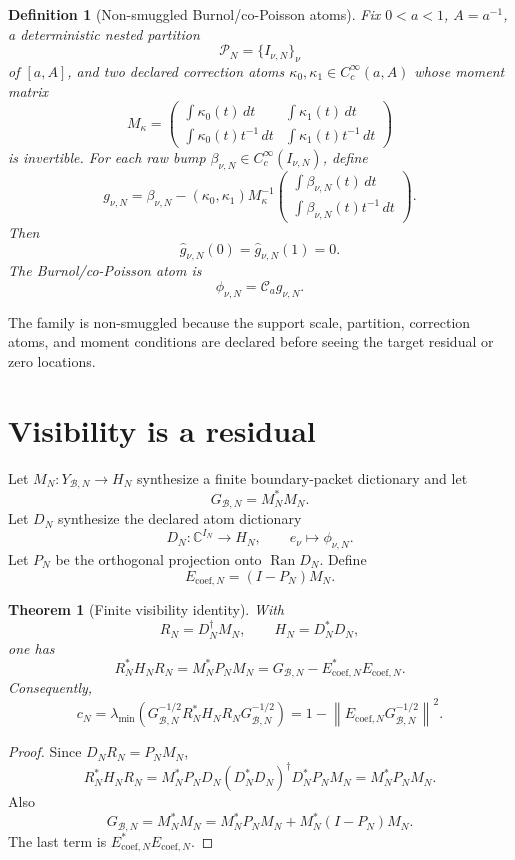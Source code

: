 \documentclass[11pt]{article}
\newtheorem{theorem}{Theorem}
\newtheorem{definition}{Definition}
\begin{document}
\begin{definition}[Non-smuggled Burnol/co-Poisson atoms]
Fix \(0<a<1\), \(A=a^{-1}\), a deterministic nested partition
\[
\mathcal P_N=\{I_{\nu,N}\}_\nu
\]
of \([a,A]\), and two declared correction atoms \(\kappa_0,\kappa_1\in C_c^\infty(a,A)\)
whose moment matrix
\[
M_\kappa=
\begin{pmatrix}
\int \kappa_0(t)\,dt & \int \kappa_1(t)\,dt\\
\int \kappa_0(t)t^{-1}\,dt & \int \kappa_1(t)t^{-1}\,dt
\end{pmatrix}
\]
is invertible.
For each raw bump \(\beta_{\nu,N}\in C_c^\infty(I_{\nu,N})\), define
\[
g_{\nu,N}
=
\beta_{\nu,N}
-
(\kappa_0,\kappa_1)M_\kappa^{-1}
\begin{pmatrix}
\int \beta_{\nu,N}(t)\,dt\\
\int \beta_{\nu,N}(t)t^{-1}\,dt
\end{pmatrix}.
\]
Then
\[
\widehat g_{\nu,N}(0)=\widehat g_{\nu,N}(1)=0.
\]
The Burnol/co-Poisson atom is
\[
\phi_{\nu,N}=\mathcal C_a g_{\nu,N}.
\]
\end{definition}

The family is non-smuggled because the support scale, partition, correction atoms, and moment
conditions are declared before seeing the target residual or zero locations.

\section{Visibility is a residual}

Let \(M_N:Y_{\mathcal B,N}\to H_N\) synthesize a finite boundary-packet dictionary and let
\[
G_{\mathcal B,N}=M_N^*M_N.
\]
Let \(D_N\) synthesize the declared atom dictionary
\[
D_N:\mathbb C^{I_N}\to H_N,\qquad e_\nu\mapsto \phi_{\nu,N}.
\]
Let \(P_N\) be the orthogonal projection onto \(\operatorname{Ran}D_N\).  Define
\[
E_{\mathrm{coef},N}=(I-P_N)M_N.
\]

\begin{theorem}[Finite visibility identity]
With
\[
R_N=D_N^\dagger M_N,\qquad H_N=D_N^*D_N,
\]
one has
\[
R_N^*H_NR_N
=
M_N^*P_NM_N
=
G_{\mathcal B,N}-E_{\mathrm{coef},N}^*E_{\mathrm{coef},N}.
\]
Consequently,
\[
c_N
=
\lambda_{\min}\!\left(
G_{\mathcal B,N}^{-1/2}R_N^*H_NR_NG_{\mathcal B,N}^{-1/2}
\right)
=
1-\left\|E_{\mathrm{coef},N}G_{\mathcal B,N}^{-1/2}\right\|^2.
\]
\end{theorem}

\begin{proof}
Since \(D_NR_N=P_NM_N\),
\[
R_N^*H_NR_N
=
M_N^*P_ND_N(D_N^*D_N)^\dagger D_N^*P_NM_N
=
M_N^*P_NM_N.
\]
Also
\[
G_{\mathcal B,N}=M_N^*M_N
=
M_N^*P_NM_N+M_N^*(I-P_N)M_N.
\]
The last term is \(E_{\mathrm{coef},N}^*E_{\mathrm{coef},N}\).
\end{proof}
\end{document}
